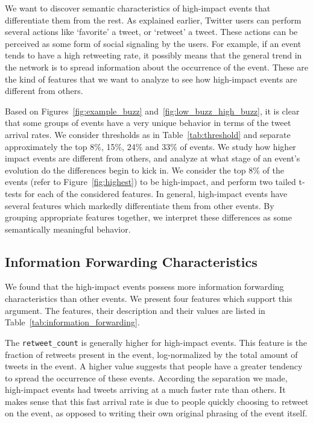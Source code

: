 
We want to discover semantic characteristics of high-impact events
that differentiate them from the rest. As explained earlier, Twitter
users can perform several actions like `favorite' a tweet, or
`retweet' a tweet. These actions can be perceived as some form of
social signaling by the users. For example, if an event tends to have
a high retweeting rate, it possibly means that the general trend in
the network is to spread information about the occurrence of the
event. These are the kind of features that we want to analyze to see
how high-impact events are different from others.

Based on Figures~\ref{fig:example_buzz}
and~\ref{fig:low_buzz_high_buzz}, it is clear that some groups of
events have a very unique behavior in terms of the tweet arrival
rates. We consider thresholds as in Table~\ref{tab:threshold} and
separate approximately the top 8\%, 15\%, 24\% and 33\% of events. We
study how higher impact events are different from others, and analyze
at what stage of an event's evolution do the differences begin to kick
in. We consider the top 8\% of the events (refer to
Figure~\ref{fig:highest}) to be high-impact, and perform two tailed
t-tests for each of the considered features. In general, high-impact
events have several features which markedly differentiate them from
other events. By grouping appropriate features together, we interpret
these differences as some semantically meaningful behavior.

\subsection{Information Forwarding Characteristics}
\label{subsec:info_forwarding}
We found that the high-impact events possess more information
forwarding characteristics than other events. We present four features
which support this argument. The features, their description and their
values are listed in Table~\ref{tab:information_forwarding}.


The \texttt{retweet\_count} is generally higher for high-impact
events. This feature is the fraction of retweets present in the event,
log-normalized by the total amount of tweets in the event. A higher
value suggests that people have a greater tendency to spread the
occurrence of these events. According the separation we made,
high-impact events had tweets arriving at a much faster rate than
others. It makes sense that this fast arrival rate is due to people
quickly choosing to retweet on the event, as opposed to writing their
own original phrasing of the event itself.

